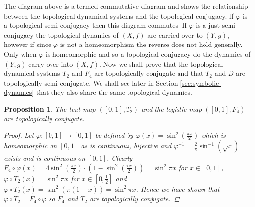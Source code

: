 \documentclass[11pt,a4paper,oneside]{memoir}
\theoremstyle{plain}
\newtheorem{prop}[thm]{Proposition}
\theoremstyle{definition}
\begin{document}
\begin{center}
\end{center}

The diagram above is a termed commutative diagram and shows the relationship between the topological dynamical systems and the topological conjugacy. If $\varphi$ is a topological semi-conjugacy then this diagram commutes. If $\varphi$ is a just semi-conjugacy the topological dynamics of $(X, f)$ are carried over to $(Y, g)$, however if since $\varphi$ is not a homeomorphism the reverse does not hold generally. Only when $\varphi$ is homeomorphic and so a topological conjugacy do the dynamics of $(Y, g)$ carry over into $(X, f)$. Now we shall prove that the topological dynamical systems $T_2$ and $F_4$ are topologically conjugate and that $T_2$ and $D$ are topologically semi-conjugate. We shall see later in Section \ref{sec:symbolic-dynamics} that they also share the same topological dynamics.

\begin{prop} \label{prop:tent-logistic-conjugate}
    The tent map $([0, 1], T_2)$ and the logistic map $([0, 1], F_4)$ are topologically conjugate.
    \begin{proof}
        Let $\varphi: [0, 1] \to [0,1]$ be defined by $\varphi(x) = \sin^2(\frac{\pi x}{2})$ which is homeomorphic on $[0, 1]$ as is continuous, bijective and $\varphi^{-1} = \frac{2}{\pi} \sin^{-1}(\sqrt{x})$ exists and is continuous on $[0, 1]$. Clearly $F_4 \circ \varphi(x) = 4 \sin^2\left(\frac{\pi x}{2}\right) \cdot \left(1 - \sin^2\left(\frac{\pi x}{2}\right)\right) = \sin^2\pi x$ for $x \in [0, 1]$, $\varphi \circ T_2(x) = \sin^2\pi x$ for $x \in \left[0, \frac{1}{2}\right]$ and $\varphi \circ T_2(x) = \sin^2 (\pi (1-x)) = \sin^2 \pi x$. Hence we have shown that $\varphi \circ T_2 = F_4 \circ \varphi$ so $F_4$ and $T_2$ are topologically conjugate.
    \end{proof}
\end{prop}
\end{document}
